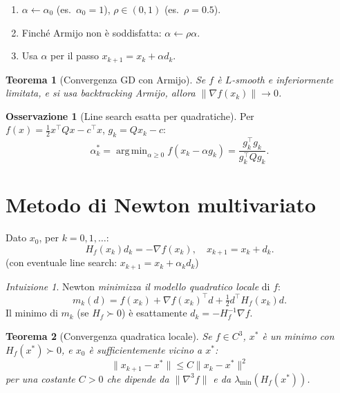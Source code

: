 \documentclass[11pt, a4paper, twoside]{book}
\theoremstyle{definition}
\newtheorem{remark}{Osservazione}[chapter]
\theoremstyle{plain}
\newtheorem{thm}{Teorema}[chapter]
\theoremstyle{remark}
\newtheorem{intuition}{Intuizione}[chapter]
\DeclareMathOperator*{\argmin}{arg\,min}
\begin{document}
\begin{algobox}
\begin{enumerate}
  \item $\alpha \leftarrow \alpha_0$ (es.\ $\alpha_0 = 1$), $\rho \in (0,1)$ (es.\ $\rho = 0.5$).
  \item Finché Armijo non è soddisfatta: $\alpha \leftarrow \rho\alpha$.
  \item Usa $\alpha$ per il passo $x_{k+1} = x_k + \alpha d_k$.
\end{enumerate}
\end{algobox}

\begin{thm}[Convergenza GD con Armijo]
Se $f$ è $L$-smooth e inferiormente limitata, e si usa backtracking Armijo, allora $\|\nabla f(x_k)\| \to 0$.
\end{thm}

\begin{remark}[Line search esatta per quadratiche]
Per $f(x) = \frac{1}{2}x^\top Q x - c^\top x$, $g_k = Qx_k - c$:
\[
  \alpha_k^* = \argmin_{\alpha \geq 0} f(x_k - \alpha g_k) = \frac{g_k^\top g_k}{g_k^\top Q g_k}.
\]
\end{remark}

\section{Metodo di Newton multivariato}
\label{sec:newton}

\begin{algobox}
Dato $x_0$, per $k = 0, 1, \ldots$:
\[
  H_f(x_k) d_k = -\nabla f(x_k), \quad x_{k+1} = x_k + d_k.
\]
(con eventuale line search: $x_{k+1} = x_k + \alpha_k d_k$)
\end{algobox}

\begin{intuition}
Newton \emph{minimizza il modello quadratico locale} di $f$:
\[
  m_k(d) = f(x_k) + \nabla f(x_k)^\top d + \tfrac{1}{2} d^\top H_f(x_k) d.
\]
Il minimo di $m_k$ (se $H_f \succ 0$) è esattamente $d_k = -H_f^{-1}\nabla f$.
\end{intuition}

\begin{thm}[Convergenza quadratica locale]
Se $f \in C^3$, $x^*$ è un minimo con $H_f(x^*) \succ 0$, e $x_0$ è sufficientemente vicino a $x^*$:
\[
  \|x_{k+1} - x^*\| \leq C \|x_k - x^*\|^2
\]
per una costante $C > 0$ che dipende da $\|\nabla^3 f\|$ e da $\lambda_{\min}(H_f(x^*))$.
\end{thm}
\end{document}
